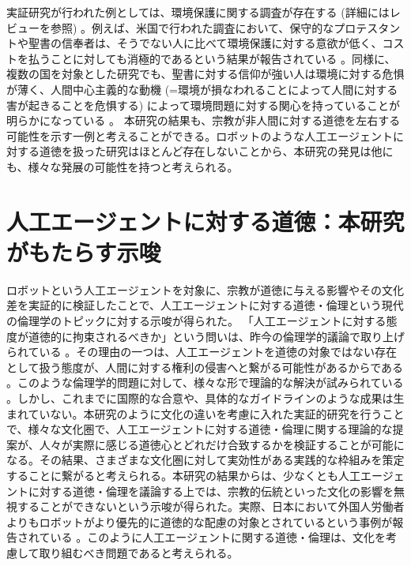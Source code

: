 \documentclass[a4j,12pt]{jreport}
\begin{document}
実証研究が行われた例としては、環境保護に関する調査が存在する (詳細にはレビュー\cite{proen}を参照) 。例えば、米国で行われた調査において、保守的なプロテスタントや聖書の信奉者は、そうでない人に比べて環境保護に対する意欲が低く、コストを払うことに対しても消極的であるという結果が報告されている\cite{ameri} 。同様に、複数の国を対象とした研究でも、聖書に対する信仰が強い人は環境に対する危惧が薄く、人間中心主義的な動機 (=環境が損なわれることによって人間に対する害が起きることを危惧する) によって環境問題に対する関心を持っていることが明らかになっている\cite{multi} 。
本研究の結果も、宗教が非人間に対する道徳を左右する可能性を示す一例と考えることができる。ロボットのような人工エージェントに対する道徳を扱った研究はほとんど存在しないことから、本研究の発見は他にも、様々な発展の可能性を持つと考えられる。





% 


\section{人工エージェントに対する道徳：本研究がもたらす示唆}
ロボットという人工エージェントを対象に、宗教が道徳に与える影響やその文化差を実証的に検証したことで、人工エージェントに対する道徳・倫理という現代の倫理学のトピックに対する示唆が得られた。
「人工エージェントに対する態度が道徳的に拘束されるべきか」という問いは、昨今の倫理学的議論で取り上げられている\cite{whitby} 。その理由の一つは、人工エージェントを道徳の対象ではない存在として扱う態度が、人間に対する権利の侵害へと繋がる可能性があるからである\cite{sex} 。このような倫理学的問題に対して、様々な形で理論的な解決が試みられている\cite{coeck, danaha} 。しかし、これまでに国際的な合意や、具体的なガイドラインのような成果は生まれていない。本研究のように文化の違いを考慮に入れた実証的研究を行うことで、様々な文化圏で、人工エージェントに対する道徳・倫理に関する理論的な提案が、人々が実際に感じる道徳心とどれだけ合致するかを検証することが可能になる。その結果、さまざまな文化圏に対して実効性がある実践的な枠組みを策定することに繋がると考えられる。本研究の結果からは、少なくとも人工エージェントに対する道徳・倫理を議論する上では、宗教的伝統といった文化の影響を無視することができないという示唆が得られた。実際、日本において外国人労働者よりもロボットがより優先的に道徳的な配慮の対象とされているという事例が報告されている\cite{immig} 。このように人工エージェントに関する道徳・倫理は、文化を考慮して取り組むべき問題であると考えられる。
\end{document}
